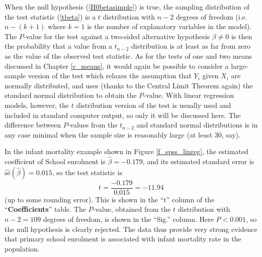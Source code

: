 When the null hypothesis (\ref{H0betasimple}) is true, the sampling
distribution of the test statistic (\ref{tbeta}) is a $t$ distribution
with $n-2$ degrees of freedom (i.e.\ $n-(k+1)$ where $k=1$ is the number
of explanatory variables in the model). The $P$-value for the test
against a two-sided alternative hypothesis $\beta\ne 0$ is then the
probability that a value from a $t_{n-2}$ distribution is at least as
far from zero as the value of the observed test statistic. As for the
tests of one and two means discussed in Chapter \ref{c_means},
it would again be possible to consider a large-sample
version of the test which relaxes the assumption that $Y_{i}$ given
$X_{i}$ are normally distributed, and uses (thanks to the Central Limit
Theorem again) the standard normal distribution to obtain the $P$-value.
With linear regression models, however, the $t$ distribution version of
the test is usually used and included in standard computer output, so
only it will be discussed here. The difference between $P$-values from
the $t_{n-2}$ and standard normal distributions is in any case minimal
when the sample size is reasonably large (at least 30, say).

In the infant mortality example shown in Figure \ref{f_spss_linreg}, the
estimated coefficient of School enrolment is
$\hat{\beta}=-0.179$, and its estimated standard error
is $\hat{\text{se}}(\hat{\beta})=0.015$, so the test statistic
is
\[
t=\frac{-0.179}{0.015}=-11.94
\]
(up to some rounding error). This is shown in the ``t'' column of the
``\textbf{Coefficients}'' table. The $P$-value, obtained from the
$t$ distribution with $n-2=109$ degrees of freedom, is shown in the
``Sig.'' column. Here $P<0.001$, so the null hypothesis is clearly
rejected. The data thus provide very strong evidence that primary school
enrolment is associated with infant mortality rate in the population.

